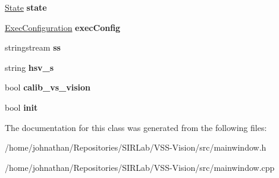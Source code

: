 \begin{DoxyCompactItemize}
\item 
\hyperlink{structcommon_1_1State}{State} {\bfseries state}\hypertarget{classMainWindow_a5eee26949e66f69193d9858771c482fc}{}\label{classMainWindow_a5eee26949e66f69193d9858771c482fc}

\item 
\hyperlink{structcommon_1_1ExecConfiguration}{Exec\+Configuration} {\bfseries exec\+Config}\hypertarget{classMainWindow_aa43de17b014bc536003744e375edbdfa}{}\label{classMainWindow_aa43de17b014bc536003744e375edbdfa}

\item 
stringstream {\bfseries ss}\hypertarget{classMainWindow_a54b6cd90f16d24527b304706581914b2}{}\label{classMainWindow_a54b6cd90f16d24527b304706581914b2}

\item 
string {\bfseries hsv\+\_\+s}\hypertarget{classMainWindow_a37fe4fad93ad48280423790a7a6ec91b}{}\label{classMainWindow_a37fe4fad93ad48280423790a7a6ec91b}

\item 
bool {\bfseries calib\+\_\+vs\+\_\+vision}\hypertarget{classMainWindow_abe010ee26a578d28fdd957bb622ba6e1}{}\label{classMainWindow_abe010ee26a578d28fdd957bb622ba6e1}

\item 
bool {\bfseries init}\hypertarget{classMainWindow_a851cc4123139bb6d049f4e1e05e3bcc9}{}\label{classMainWindow_a851cc4123139bb6d049f4e1e05e3bcc9}

\end{DoxyCompactItemize}


The documentation for this class was generated from the following files\+:\begin{DoxyCompactItemize}
\item 
/home/johnathan/\+Repositories/\+S\+I\+R\+Lab/\+V\+S\+S-\/\+Vision/src/mainwindow.\+h\item 
/home/johnathan/\+Repositories/\+S\+I\+R\+Lab/\+V\+S\+S-\/\+Vision/src/mainwindow.\+cpp\end{DoxyCompactItemize}

